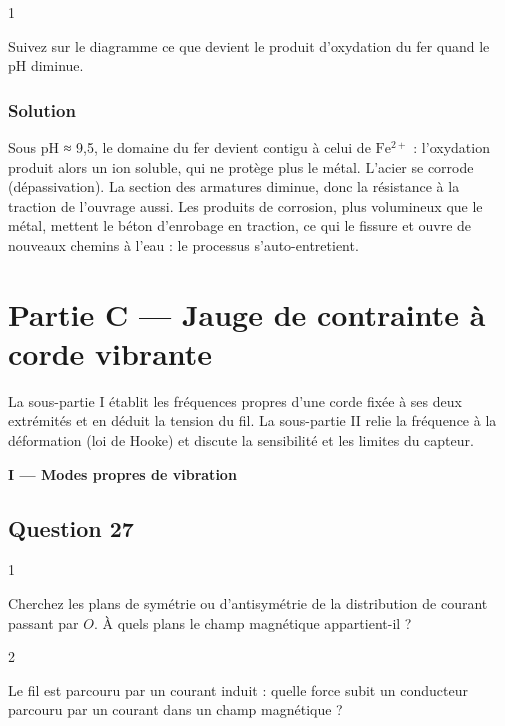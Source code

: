 \documentclass[11pt,a4paper]{article}
\begin{document}
\begin{indication}{1}

Suivez sur le diagramme ce que devient le produit d'oxydation du fer quand le pH diminue.

\end{indication}

\hypertarget{solution-25}{%
\subsubsection{Solution}\label{solution-25}}

Sous pH ≈ 9,5, le domaine du fer devient contigu à celui de \(\mathrm{Fe^{2+}}\) : l'oxydation produit alors un ion soluble, qui ne protège plus le métal. L'acier se corrode (dépassivation). La section des armatures diminue, donc la résistance à la traction de l'ouvrage aussi. Les produits de corrosion, plus volumineux que le métal, mettent le béton d'enrobage en traction, ce qui le fissure et ouvre de nouveaux chemins à l'eau : le processus s'auto-entretient.

\hypertarget{partie-c-jauge-de-contrainte-uxe0-corde-vibrante}{%
\section{Partie C --- Jauge de contrainte à corde vibrante}\label{partie-c-jauge-de-contrainte-uxe0-corde-vibrante}}

La sous-partie I établit les fréquences propres d'une corde fixée à ses deux extrémités et en déduit la tension du fil. La sous-partie II relie la fréquence à la déformation (loi de Hooke) et discute la sensibilité et les limites du capteur.

\textbf{I --- Modes propres de vibration}

\hypertarget{question-27}{%
\subsection{Question 27}\label{question-27}}

\begin{indication}{1}

Cherchez les plans de symétrie ou d'antisymétrie de la distribution de courant passant par \(O\). À quels plans le champ magnétique appartient-il ?

\end{indication}

\begin{indication}{2}

Le fil est parcouru par un courant induit : quelle force subit un conducteur parcouru par un courant dans un champ magnétique ?

\end{indication}
\end{document}
